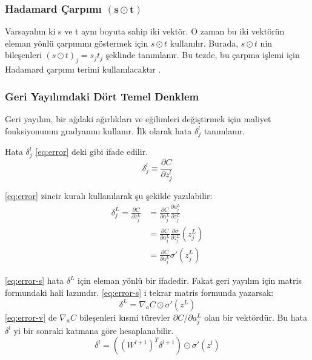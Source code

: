 \subsubsection{Hadamard Çarpımı \(\mathbf{\left( s \odot t \right)}\)}

Varsayalım ki s ve t aynı boyuta sahip iki vektör. O zaman bu iki vektörün eleman yönlü çarpımını göstermek için $s \odot t$ kullanılır. Burada, $s \odot t$ nin bileşenleri $\left(s \odot t\right)_j=s_jt_j$ şeklinde tanımlanır. Bu tezde, bu çarpma işlemi için Hadamard çarpımı terimi kullanılacaktır \cite{nielsen2015neural}.

\subsubsection{Geri Yayılımdaki Dört Temel Denklem}

Geri yayılım, bir ağdaki ağırlıkları ve eğilimleri değiştirmek için maliyet fonksiyonunun gradyanını kullanır. İlk olarak hata $\delta^l_j$ tanımlanır.

Hata $\delta^l_j$ \eqref{eq:error} deki gibi ifade edilir.
\begin{equation}
    \delta^l_j \equiv \frac{\partial C}{\partial z^l_j}
    \label{eq:error}
\end{equation}

\eqref{eq:error} zincir kuralı kullanılarak şu şekilde yazılabilir:
\begin{equation}
    \begin{split}
        \delta^L_j = \frac{\partial C}{\partial z^L_j} &= \frac{\partial C}{\partial a^L_j}\frac{\partial a^L_j}{\partial z^L_j} \\ &= \frac{\partial C}{\partial a^L_j}\frac{\partial \sigma}{\partial z^L_j} \left( z^L_j \right) \\ &= \frac{\partial C}{\partial a^L_j} \sigma'(z^L_j)
    \end{split}
    \label{eq:error-s}
\end{equation}

\eqref{eq:error-s} hata $\delta^L$ için eleman yönlü bir ifadedir. Fakat geri yayılım için matris formundaki hali lazımdır. \eqref{eq:error-s} i tekrar matris formunda yazarsak:
\begin{equation}
    \delta^L = \nabla_a C \odot \sigma'(z^L)
    \label{eq:error-v}
\end{equation}
\eqref{eq:error-v} de $\nabla_a C$ bileşenleri kısmi türevler $\partial C / \partial a^L_j$ olan bir vektördür.
Bu hata $\delta^l$ yi bir sonraki katmana göre hesaplanabilir.
\begin{equation}
    \delta^l = \left((W^{l+1})^T \delta^{l+1} \right) \odot \sigma'(z^l)
    \label{eq:error-r}
\end{equation}



